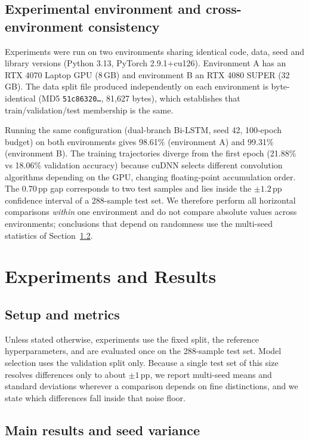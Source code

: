 \documentclass[11pt,a4paper]{article}
\begin{document}
\subsection{Experimental environment and cross-environment consistency}
\label{sec:env}

Experiments were run on two environments sharing identical code, data, seed and library versions (Python 3.13, PyTorch 2.9.1+cu126). Environment A has an RTX 4070 Laptop GPU (8\,GB) and environment B an RTX 4080 SUPER (32\,GB). The data split file produced independently on each environment is byte-identical (MD5 \texttt{51c86320\ldots}, 81{,}627 bytes), which establishes that train/validation/test membership is the same.

Running the same configuration (dual-branch Bi-LSTM, seed 42, 100-epoch budget) on both environments gives 98.61\% (environment A) and 99.31\% (environment B). The training trajectories diverge from the first epoch (21.88\% vs 18.06\% validation accuracy) because cuDNN selects different convolution algorithms depending on the GPU, changing floating-point accumulation order. The 0.70\,pp gap corresponds to two test samples and lies inside the $\pm1.2$\,pp confidence interval of a 288-sample test set. We therefore perform all horizontal comparisons \emph{within} one environment and do not compare absolute values across environments; conclusions that depend on randomness use the multi-seed statistics of Section~\ref{sec:main}.

\section{Experiments and Results}
\label{sec:results}

\subsection{Setup and metrics}

Unless stated otherwise, experiments use the fixed split, the reference hyperparameters, and are evaluated once on the 288-sample test set. Model selection uses the validation split only. Because a single test set of this size resolves differences only to about $\pm1$\,pp, we report multi-seed means and standard deviations wherever a comparison depends on fine distinctions, and we state which differences fall inside that noise floor.

\subsection{Main results and seed variance}
\label{sec:main}
\end{document}
